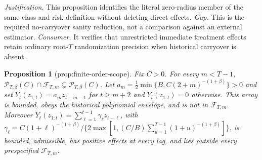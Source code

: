 \documentclass{article}
\newtheorem{proposition}{Proposition}
\begin{document}
\par\smallskip\noindent \textit{Justification.} This proposition identifies the literal zero-radius member of the same class and risk definition without deleting direct effects. \textit{Gap.} This is the required no-carryover sanity reduction, not a comparison against an external estimator. \textit{Consumer.} It verifies that unrestricted immediate treatment effects retain ordinary root-\(T\) randomization precision when historical carryover is absent.

\begin{proposition}[prop:finite-order-scope]\label{prop:finite-order-scope}
Fix \(C>0\). For every \(m<T-1\), \(\mathcal P_{T,\beta}(C)\cap\mathcal F_{T,m}\subsetneq\mathcal P_{T,\beta}(C)\). Let \(a_m=\tfrac12\min\{B,C(2+m)^{-(1+\beta)}\}>0\) and set \(Y_t(z_{1:t})=a_mz_{t-m-1}\) for \(t\ge m+2\) and \(Y_t(z_{1:t})=0\) otherwise. This array is bounded, obeys the historical polynomial envelope, and is not in \(\mathcal F_{T,m}\). Moreover \(Y_t(z_{1:t})=\sum_{\ell=1}^{t-1}\gamma_\ell z_{t-\ell}\), with \(\gamma_\ell=C(1+\ell)^{-(1+\beta)}/\{2\max[1,(C/B)\sum_{u=1}^{T-1}(1+u)^{-(1+\beta)}]\}\), is bounded, admissible, has positive effects at every lag, and lies outside every prespecified \(\mathcal F_{T,m}\).
\end{proposition}
\end{document}
